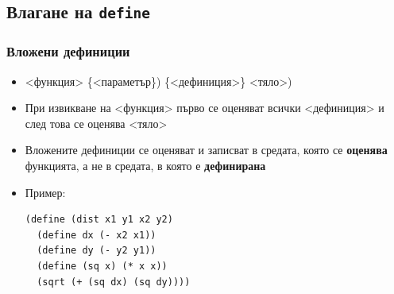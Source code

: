 \documentclass{beamer}
\begin{document}


\subsection{Влагане на \tt{define}}

\begin{frame}[fragile]
  \frametitle{Вложени дефиниции}

  \begin{itemize}
  \item {}<функция> \{<параметър\}\tta) \{<дефиниция>\} <тяло>\tta)
  \item При извикване на <функция> първо се оценяват всички <дефиниция> и след това се оценява <тяло>
  \item Вложените дефиниции се оценяват и записват в средата, която се \textbf{оценява} функцията, а не в средата, в която е \textbf{дефинирана}
  \item Пример:\\
\begin{lstlisting}
(define (dist x1 y1 x2 y2)
  (define dx (- x2 x1))
  (define dy (- y2 y1))
  (define (sq x) (* x x))
  (sqrt (+ (sq dx) (sq dy))))
\end{lstlisting}
  \end{itemize}
\end{frame}
\end{document}
